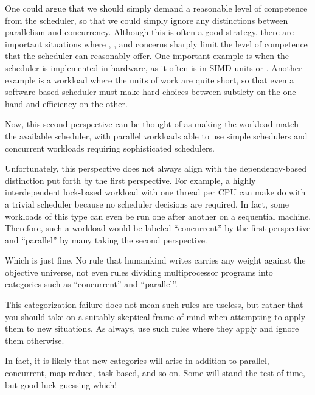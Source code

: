 One could argue that we should simply demand a reasonable level of
competence from the scheduler, so that we could simply ignore any
distinctions between parallelism and concurrency.
Although this is often a good strategy,
there are important situations where ,
, and  concerns sharply limit the level
of competence that the scheduler can reasonably offer.
One important example is when the scheduler is implemented in
hardware, as it often is in SIMD units or .
Another example is a workload where the units of work are quite
short, so that even a software-based scheduler must make hard choices
between subtlety on the one hand and efficiency on the other.

Now, this second perspective can be thought of as making the workload
match the available scheduler, with parallel workloads able to
use simple schedulers and concurrent workloads requiring
sophisticated schedulers.

Unfortunately, this perspective does not always align with the
dependency-based distinction put forth by the first perspective.
For example, a highly interdependent lock-based workload
with one thread per CPU can make do with a trivial scheduler
because no scheduler decisions are required.
In fact, some workloads of this type can even be run one after another
on a sequential machine.
Therefore, such a workload would be labeled ``concurrent'' by the first
perspective and ``parallel'' by many taking the second perspective.

\QuickQuizEnd

Which is just fine.
No rule that humankind writes carries any weight against the objective
universe, not even rules dividing multiprocessor programs into categories
such as ``concurrent'' and ``parallel''.

This categorization failure does not mean such rules are useless,
but rather that you should take on a suitably skeptical frame of mind when
attempting to apply them to new situations.
As always, use such rules where they apply and ignore them otherwise.

In fact, it is likely that new categories will arise in addition
to parallel, concurrent, map-reduce, task-based, and so on.
Some will stand the test of time, but good luck guessing which!
